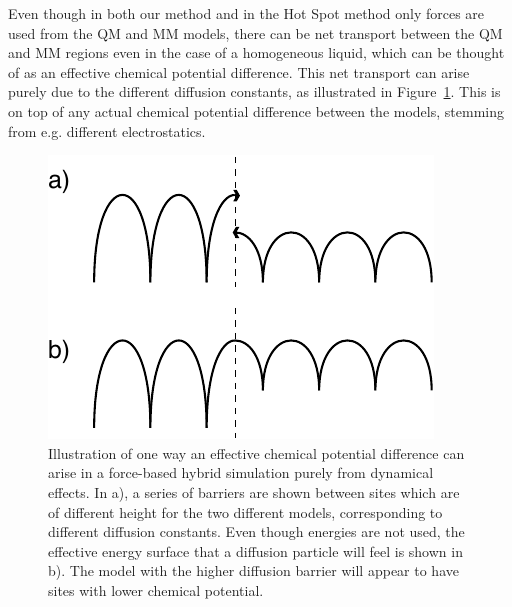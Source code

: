 \documentclass[11pt]{revtex4}
\begin{document}
Even though in both our method and in the Hot Spot method only forces are used from the QM and MM models, there can be net transport between the QM and MM regions even in the case of a homogeneous liquid, which can be thought of as an effective chemical potential difference. This net transport can arise purely due to the different diffusion constants, as illustrated in Figure~\ref{diffusion_sketch}. This is on top of any actual chemical potential difference between the models, stemming from e.g. different electrostatics. 

\begin{figure}
\includegraphics{diffusion}
\caption{Illustration of one way an effective chemical potential difference can arise in a force-based hybrid simulation purely from dynamical effects. In a), a series of barriers are shown between sites which are of different height for the two different models, corresponding to different diffusion constants. Even though energies are not used, the effective energy surface that a diffusion particle will feel is shown in b). The model with the higher diffusion barrier will appear to have sites with lower chemical potential. }
\label{diffusion_sketch}
\end{figure}
\end{document}
